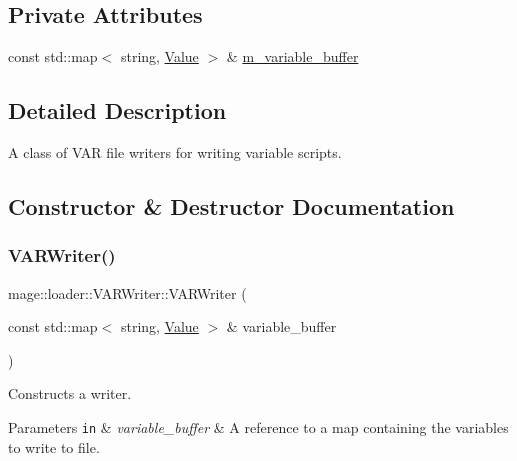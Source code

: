 \subsection*{Private Attributes}
\begin{DoxyCompactItemize}
\item 
const std\+::map$<$ string, \mbox{\hyperlink{namespacemage_a5bc219b33037a43e23f59e4e8ddff10d}{Value}} $>$ \& \mbox{\hyperlink{classmage_1_1loader_1_1_v_a_r_writer_a405d288ded715f12f6f3c8cf29beb6a6}{m\+\_\+variable\+\_\+buffer}}
\end{DoxyCompactItemize}


\subsection{Detailed Description}
A class of V\+AR file writers for writing variable scripts. 

\subsection{Constructor \& Destructor Documentation}
\mbox{\label{classmage_1_1loader_1_1_v_a_r_writer_af9b9e552dc77446790bbd52390b42582}} 
\subsubsection{\texorpdfstring{V\+A\+R\+Writer()}{VARWriter()}\hspace{0.1cm}{\footnotesize\ttfamily [1/3]}}
{\footnotesize\ttfamily mage\+::loader\+::\+V\+A\+R\+Writer\+::\+V\+A\+R\+Writer (\begin{DoxyParamCaption}\item[{const std\+::map$<$ string, \mbox{\hyperlink{namespacemage_a5bc219b33037a43e23f59e4e8ddff10d}{Value}} $>$ \&}]{variable\+\_\+buffer }\end{DoxyParamCaption})\hspace{0.3cm}{\ttfamily [explicit]}}

Constructs a writer.


\begin{DoxyParams}[1]{Parameters}
\mbox{\tt in}  & {\em variable\+\_\+buffer} & A reference to a map containing the variables to write to file. \\
\hline
\end{DoxyParams}
\mbox{\label{classmage_1_1loader_1_1_v_a_r_writer_a5ddb3fcd75952ecc8593bc284dc3db0e}} 
